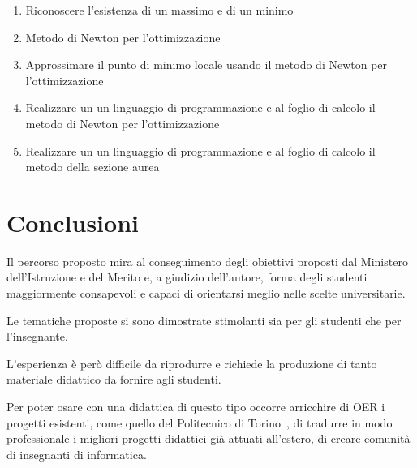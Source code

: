 \documentclass[a4paper]{easychair}
\begin{document}
\begin{enumerate}
  \item
  Riconoscere l'esistenza di un massimo e di un minimo
  \item
    Metodo di Newton per l'ottimizzazione
  \item
    Approssimare il punto di minimo locale usando il metodo di Newton
  per l'ottimizzazione
  \item
    Realizzare un un linguaggio di programmazione e al foglio di calcolo
  il metodo di Newton per l'ottimizzazione
  \item
    Realizzare un un linguaggio di programmazione e al foglio di calcolo
  il metodo della sezione aurea
\end{enumerate}
  
\section{Conclusioni}

Il percorso proposto mira al conseguimento degli obiettivi proposti dal Ministero
dell'Istruzione e del Merito e, a giudizio dell'autore, forma degli studenti
maggiormente consapevoli e capaci di orientarsi meglio nelle scelte universitarie.

Le tematiche proposte si sono dimostrate stimolanti sia per gli studenti che per
l'insegnante.

L'esperienza è però difficile da riprodurre e richiede la produzione di tanto materiale
didattico da fornire agli studenti. 

Per poter osare con una didattica di questo tipo occorre arricchire di OER i progetti
esistenti, come quello del Politecnico di Torino~\cite{fare}, di tradurre in modo
professionale i migliori progetti didattici già attuati all'estero, di creare
comunità di insegnanti di informatica.

\label{sect:bib}

%
%
%

\end{document}
